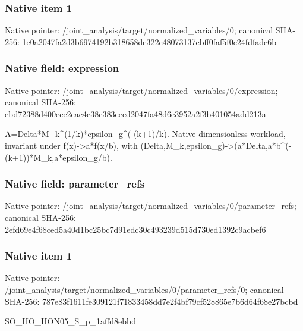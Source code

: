 \documentclass[10pt,a4paper]{article}
\begin{document}
\subsubsection{Native item 1}
Native pointer: /joint\_\allowbreak{}analysis/target/normalized\_\allowbreak{}variables/0; canonical SHA-256: 1e0a2047fa2d3b6974192b318658de322c48073137ebff0faf5f0c24fdfadc6b

\subsubsection{Native field: expression}
Native pointer: /joint\_\allowbreak{}analysis/target/normalized\_\allowbreak{}variables/0/expression; canonical SHA-256: ebd72388d400ece2eac4c38c383eecd2047fa48d6e3952a2f3b401054add213a

\begingroup\raggedright\sloppy A=\allowbreak{}Delta*M\_\allowbreak{}k\textasciicircum{}(1/\allowbreak{}k)*epsilon\_\allowbreak{}g\textasciicircum{}(-(k+1)/\allowbreak{}k). Native dimensionless workload,\allowbreak{} invariant under f(x)->a*f(x/\allowbreak{}b),\allowbreak{} with (Delta,\allowbreak{}M\_\allowbreak{}k,\allowbreak{}epsilon\_\allowbreak{}g)->(a*Delta,\allowbreak{}a*b\textasciicircum{}(-(k+1))*M\_\allowbreak{}k,\allowbreak{}a*epsilon\_\allowbreak{}g/\allowbreak{}b).\par\endgroup

\subsubsection{Native field: parameter\_\allowbreak{}refs}
Native pointer: /joint\_\allowbreak{}analysis/target/normalized\_\allowbreak{}variables/0/parameter\_\allowbreak{}refs; canonical SHA-256: 2efd69e4f68ced5a40d1bc25bc7d91edc30c493239d515d730ed1392c9acbef6

\subsubsection{Native item 1}
Native pointer: /joint\_\allowbreak{}analysis/target/normalized\_\allowbreak{}variables/0/parameter\_\allowbreak{}refs/0; canonical SHA-256: 787e83f1611fe309121f71833458dd7e2f4bf79cf528865e7b6d64f68e27bcbd

\begingroup\raggedright\sloppy SO\_\allowbreak{}HO\_\allowbreak{}HON05\_\allowbreak{}S\_\allowbreak{}p\_\allowbreak{}1affd8ebbd\par\endgroup
\end{document}
